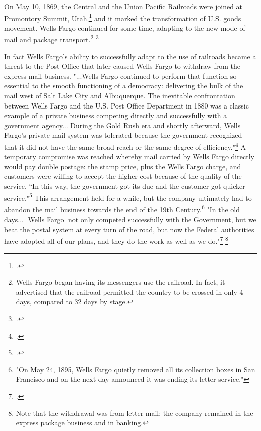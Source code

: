 On May 10, 1869, the Central and the Union Pacific Railroads were joined at Promontory Summit, Utah,\footcite{sfmuseum} and it marked the transformation of U.S. goods movement. Wells Fargo continued for some time, adapting to the new mode of mail and package transport.\footnote{Wells Fargo began having its messengers use the railroad. In fact, it advertised that the railroad permitted the country to be crossed in only 4 days, compared to 32 days by stage.} \footcite{Stagcoach}

In fact Wells Fargo’s ability to successfully adapt to the use of railroads became a threat to the Post Office that later caused Wells Fargo to withdraw from the express mail business.  "...Wells Fargo continued to perform that function so essential to the smooth functioning of a democracy: delivering the bulk of the mail west of Salt Lake City and Albuquerque.  The inevitable confrontation between Wells Fargo and the U.S. Post Office Department in 1880 was a classic example of a private business competing directly and successfully with a government agency... During the Gold Rush era and shortly afterward, Wells Fargo’s private mail system was tolerated because the government recognized that it did not have the same broad reach or the same degree of efficiency."\footcite{Stagcoach}  A temporary compromise was reached whereby mail carried by Wells Fargo directly would pay double postage: the stamp price, plus the Wells Fargo charge, and customers were willing to accept the higher cost because of the quality of the service. “In this way, the government got its due and the customer got quicker service."\footcite{Stagcoach} This arrangement held for a while, but the company ultimately had to abandon the mail business towards the end of the 19th Century.\footnote{"On May 24, 1895, Wells Fargo quietly removed all its collection boxes in San Francisco and on the next day announced it was ending its letter service."}  "In the old days... [Wells Fargo] not only competed successfully with the Government, but we beat the postal system at every turn of the road, but now the Federal authorities have adopted all of our plans, and they do the work as well as we do."\footcite{Stagcoach} \footnote{Note that the withdrawal was from letter mail; the company remained in the express package business and in banking.}

